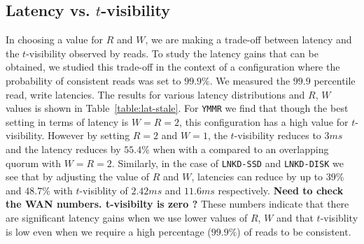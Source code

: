 \documentclass{vldb}
\begin{document}
\subsection{Latency vs. $t$-visibility}

In choosing a value for $R$ and $W$, we are making a trade-off
between latency and the $t$-visibility observed by reads. To study 
the latency gains that can be obtained, we studied this trade-off in the context 
of a configuration where the probability of consistent reads was set 
to $99.9\%$. We measured the $99.9$ percentile read, write latencies.
The results for various latency distributions and 
$R$, $W$ values is shown in Table~\ref{table:lat-stale}. 
For \texttt{YMMR} we find that though the best setting in terms of
latency is $W$$=$$R$$=$$2$, this configuration has a high value for
$t$-visibility. However by setting $R$$=$$2$ and $W$$=$$1$, the 
$t$-visibility reduces to $3ms$ and the latency reduces by $55.4\%$ 
when with a compared to an overlapping quorum with $W$$=$$R$$=$$2$. 
Similarly, in the case of 
\texttt{LNKD-SSD} and \texttt{LNKD-DISK} we see that by adjusting the value
of $R$ and $W$, latencies can reduce by up to $39\%$ and $48.7\%$ 
with $t$-visiblity of $2.42ms$ and $11.6ms$ respectively. 
\textbf{Need to check the WAN numbers. t-visibilty is zero ?}
These numbers indicate that there are significant latency gains when 
we use lower values of $R$, $W$ and that $t$-visiblity is
low even when we require a high percentage ($99.9\%$) of reads to be consistent.
\end{document}

